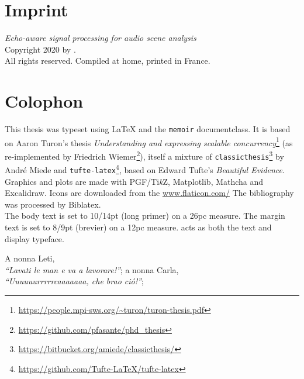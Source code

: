 \thispagestyle{empty}
\vspace*{11cm}
\section*{Imprint}

\textit{Echo-aware signal processing for audio scene analysis}\\
Copyright \textcopyright{} 2020 by \theauthor{}.\\
All rights reserved. Compiled at home, printed in France.\\

\section*{Colophon}
This thesis was typeset using \LaTeX{} and the \texttt{memoir} documentclass.
It is based on Aaron Turon's thesis \emph{Understanding and expressing scalable concurrency}\footnote{\url{https://people.mpi-sws.org/~turon/turon-thesis.pdf}}
(as re-implemented by Friedrich Wiemer\footnote{\url{https://github.com/pfasante/phd_thesis}}),
itself a mixture of \texttt{classicthesis}\footnote{\url{https://bitbucket.org/amiede/classicthesis/}} by Andr\'e Miede and \texttt{tufte-latex}\footnote{\url{https://github.com/Tufte-LaTeX/tufte-latex}},
 based on Edward Tufte's \emph{Beautiful Evidence}.\\[0.5\baselineskip]

Graphics and plots are made with PGF/Ti\emph{k}Z, Matplotlib, Mathcha and Excalidraw.
Icons are downloaded from the \url{www.flaticon.com/}
The bibliography was processed by Biblatex.\\[0.5\baselineskip]

The body text is set to 10/14pt (long primer) on a 26pc measure.
The margin text is set to 8/9pt (brevier) on a 12pc measure.
 acts as both the text and display typeface.

\thispagestyle{empty}
\vphantom{.}
\vfill
\begin{dedication}
    A nonna Leti,\\
    \textit{``Lavati le man e va a lavorare!''};
    \vfill
    a nonna Carla,\\
    \textit{``Uuuuuurrrrrcaaaaaaa, che brao ció!''};
\end{dedication}

